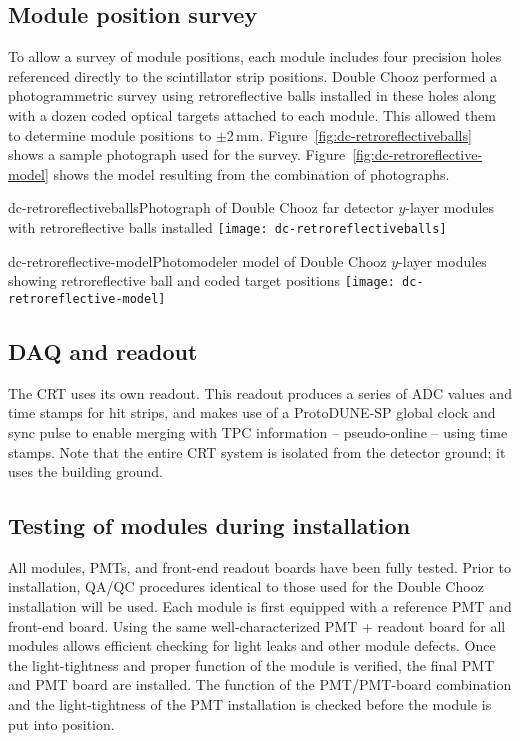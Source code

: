 \subsection{Module position survey}

To allow a survey of module positions, each module includes four precision holes 
referenced
directly to the scintillator strip positions. Double Chooz performed a photogrammetric survey using retroreflective balls installed in these holes along with a dozen coded optical targets attached to each module. This allowed them to determine module positions to $\pm$2\,mm. Figure~\ref{fig:dc-retroreflectiveballs} shows a sample photograph used for the survey. Figure~\ref{fig:dc-retroreflective-model} shows the model resulting from the combination of photographs.

\begin{cdrfigure}{dc-retroreflectiveballs}{Photograph of Double Chooz far detector $y$-layer modules with retroreflective balls installed}
  \texttt{[image: dc-retroreflectiveballs]}
\end{cdrfigure}

\begin{cdrfigure}{dc-retroreflective-model}{Photomodeler model of Double Chooz $y$-layer modules showing retroreflective ball and coded target positions}
  \texttt{[image: dc-retroreflective-model]}
\end{cdrfigure}


\subsection{DAQ and readout}

The CRT uses its own readout. This readout produces a series of ADC values and time stamps for hit strips, and makes use of a ProtoDUNE-SP global clock and sync pulse to enable merging with TPC information -- pseudo-online -- using time stamps. Note that the entire CRT system is isolated from the detector ground; it uses the building ground.

\subsection{Testing of modules during installation}

All modules, PMTs, and front-end readout boards have been fully tested. Prior to installation, QA/QC procedures identical to those used for the Double Chooz installation will be used. Each module is first equipped with a reference PMT and front-end board. Using the same well-characterized PMT + readout board for all modules allows efficient checking for light leaks and other module defects. Once the light-tightness and proper function of the module is verified, the final PMT and PMT board are installed. The function of the PMT/PMT-board combination and the light-tightness of the PMT installation is checked before the module is put into position.
